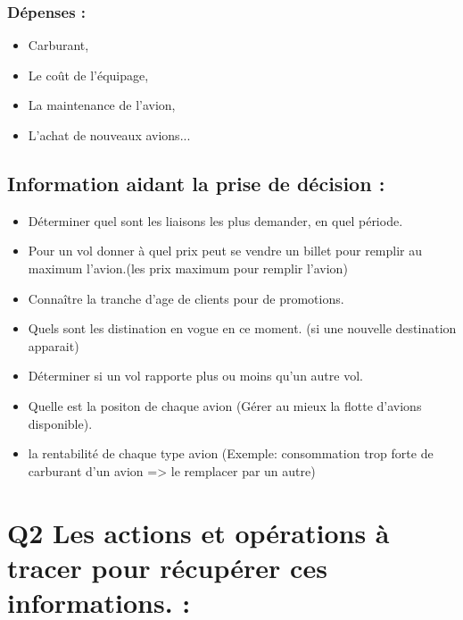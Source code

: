 \documentclass[oneside,13pt,a4paper]{article}
\begin{document}
\subsubsection{Dépenses :}

\begin{itemize}
  \item Carburant,
  \item Le coût de l’équipage,
  \item La maintenance de l'avion,
  \item L'achat de nouveaux avions...
\end{itemize}


\subsection{Information aidant la prise de décision :}

\begin{itemize}
  \item Déterminer quel sont les liaisons les plus demander, en quel période.
  \item Pour un vol donner à quel prix peut se vendre un billet pour remplir au maximum l'avion.(les prix maximum pour remplir l'avion)
  \item Connaître la tranche d'age de clients pour de promotions.
  \item Quels sont les distination en vogue en ce moment. (si une nouvelle destination apparait)
  \item Déterminer si un vol rapporte plus ou moins qu'un autre vol.
  \item Quelle est la positon de chaque avion (Gérer au mieux la flotte d'avions disponible).
  \item la rentabilité de chaque type avion (Exemple: consommation trop forte de carburant d'un avion => le remplacer par un autre)
\end{itemize}

\section{Q2 Les actions et opérations à tracer pour récupérer ces informations. : }
\end{document}
